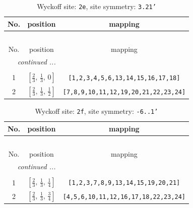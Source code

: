 \documentclass[fleqn,8pt]{jsarticle}
\begin{document}
\begin{longtable}{ccc}
\caption{Wyckoff site: {\tt 2e}, site symmetry: {\tt 3.21'}}
 \\
 \hline \hline
No. & position & mapping \\ \hline \endfirsthead

\multicolumn{2}{l}{\tablename\ \thetable{}} \\
 \hline \hline
No. & position & mapping \\ \hline \endhead

 \hline \hline
\multicolumn{2}{r}{\footnotesize\it continued ...} \\ \endfoot

 \hline \hline
\multicolumn{2}{r}{} \\ \endlastfoot

1 & $\left[ \frac{2}{3},\, \frac{1}{3},\, 0 \right]$ & {\tt [1,2,3,4,5,6,13,14,15,16,17,18]} \\ \hline
2 & $\left[ \frac{2}{3},\, \frac{1}{3},\, \frac{1}{2} \right]$ & {\tt [7,8,9,10,11,12,19,20,21,22,23,24]} \\
\end{longtable}
\renewcommand{\arraystretch}{1.2}
\begin{longtable}{ccc}
\caption{Wyckoff site: {\tt 2f}, site symmetry: {\tt -6..1'}}
 \\
 \hline \hline
No. & position & mapping \\ \hline \endfirsthead

\multicolumn{2}{l}{\tablename\ \thetable{}} \\
 \hline \hline
No. & position & mapping \\ \hline \endhead

 \hline \hline
\multicolumn{2}{r}{\footnotesize\it continued ...} \\ \endfoot

 \hline \hline
\multicolumn{2}{r}{} \\ \endlastfoot

1 & $\left[ \frac{2}{3},\, \frac{1}{3},\, \frac{1}{4} \right]$ & {\tt [1,2,3,7,8,9,13,14,15,19,20,21]} \\ \hline
2 & $\left[ \frac{2}{3},\, \frac{1}{3},\, \frac{3}{4} \right]$ & {\tt [4,5,6,10,11,12,16,17,18,22,23,24]} \\
\end{longtable}
\renewcommand{\arraystretch}{1.2}
\end{document}
